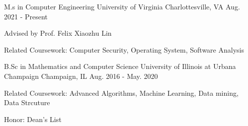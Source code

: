 


\begin{cventries}
  \cventry
    {M.s in Computer Engineering}
    {University of Virginia}
    {Charlottesville, VA}
    {Aug. 2021 - Present}
    {
      \begin{cvitems} %
        \item {Advised by Prof. Felix Xiaozhu Lin}
        \item {Related Coursework: Computer Security, Operating System, Software Analysis}
      \end{cvitems}
    }
\end{cventries}

\begin{cventries}

  \cventry
    {B.Sc in Mathematics and Computer Science}
    {University of Illinois at Urbana Champaign}
    {Champaign, IL}
    {Aug. 2016 - May. 2020}
    {
      \begin{cvitems} %
        \item {Related Coursework: Advanced Algorithms, Machine Learning, Data mining, Data Strcuture}
        \item {Honor: Dean's List}
      \end{cvitems}
    }

\end{cventries}
